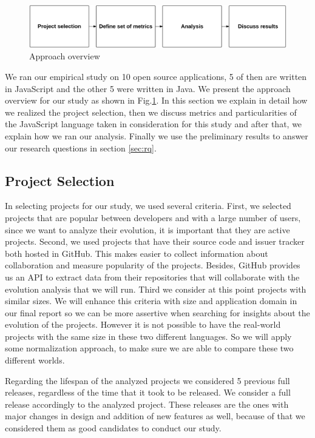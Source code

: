  \begin{figure}[thb!]
 	\caption{Approach overview}
 	\centering
 	\label{fig:approach_overview}
 	\includegraphics[width=1\textwidth]{figures/approach_overview}
 \end{figure}

We ran our empirical study on 10 open source applications, 5 of then are written in JavaScript and the other 5 were written in Java. We present the approach overview for our study as shown in Fig.\ref{fig:approach_overview}. In this section we explain in detail how we realized the project selection, then we discuss metrics and particularities of the JavaScript language taken in consideration for this study and after that, we explain how we ran our analysis. Finally we use the preliminary results to answer our research questions in section \ref{sec:rq}.

\subsection{Project Selection}

In selecting projects for our study, we used several criteria. First, we selected projects that are popular between developers and with a large number of users, since we want to analyze their evolution, it is important that they are active projects. Second, we used projects that have their source code and issuer tracker both hosted in GitHub. This makes easier to collect information about collaboration and measure popularity of the projects. Besides, GitHub provides us an API to extract data from their repositories that will collaborate with the evolution analysis that we will run. Third we consider at this point projects with similar sizes. We will enhance this criteria with size and application domain in our final report so we can be more assertive when searching for insights about the evolution of the projects. However it is not possible to have the real-world projects with the same size in these two different languages. So we will apply some normalization approach, to make sure we are able to compare these two different worlds.

Regarding the lifespan of the analyzed projects we considered 5 previous full releases, regardless of the time that it took to be released. We consider a full release accordingly to the analyzed project. These releases are the ones with major changes in design and addition of new features as well, because of that we considered them as good candidates to conduct our study.  

